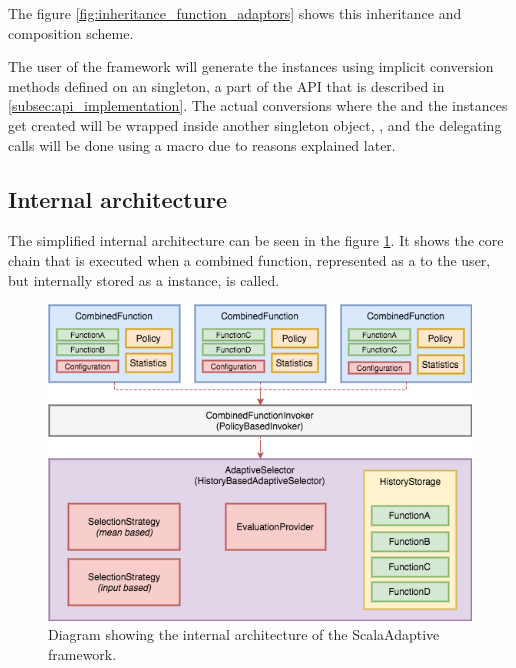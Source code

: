 The figure \ref{fig:inheritance_function_adaptors} shows this inheritance and composition scheme.

The user of the framework will generate the instances using implicit conversion methods defined on an  singleton, a part of the API that is described in \ref{subsec:api_implementation}. The actual conversions where the  and the  instances get created will be wrapped inside another singleton object, , and the delegating calls will be done using a macro due to reasons explained later.

\subsection{Internal architecture}
\label{subsec:internal_architecture}

The simplified internal architecture can be seen in the figure \ref{fig:internal_architecture}. It shows the core chain that is executed when a combined function, represented as a  to the user, but internally stored as a  instance, is called.

\begin{figure}[h!]
	\captionsetup{justification=centering,margin=0.5cm}
	\centerline{\mbox{\includegraphics[width=140mm]{./img/internal_architecture.png}}}
	\caption{Diagram showing the internal architecture of the ScalaAdaptive framework.}
	\label{fig:internal_architecture}
\end{figure}


